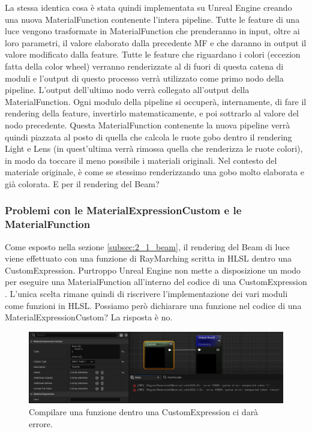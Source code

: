 \documentclass[main.tex]{subfiles}
\begin{document}
\noindent La stessa identica cosa è stata quindi implementata su Unreal Engine creando una nuova MaterialFunction contenente l'intera pipeline. Tutte le feature di una luce vengono trasformate in MaterialFunction che prenderanno in input, oltre ai loro parametri, il valore elaborato dalla precedente MF e che daranno in output il valore modificato dalla feature. Tutte le feature che riguardano i colori (eccezion fatta della color wheel) verranno renderizzate al di fuori di questa catena di moduli e l'output di questo processo verrà utilizzato come primo nodo della pipeline. L'output dell'ultimo nodo verrà collegato all'output della MaterialFunction. Ogni modulo della pipeline si occuperà, internamente, di fare il rendering della feature, invertirlo matematicamente, e poi sottrarlo al valore del nodo precedente. \newline
Questa MaterialFunction contenente la nuova pipeline verrà quindi piazzata al posto di quella che calcola le ruote gobo dentro il rendering Light e Lens (in quest'ultima verrà rimossa quella che renderizza le ruote colori), in modo da toccare il meno possibile i materiali originali. Nel contesto del materiale originale, è come se stessimo renderizzando una gobo molto elaborata e già colorata. \newline
E per il rendering del Beam?

\subsubsection{Problemi con le MaterialExpressionCustom e le MaterialFunction}\label{subsec:2_2_CM-MFproblems}
Come esposto nella sezione \ref{subsec:2_1_beam}, il rendering del Beam di luce viene effettuato con una funzione di RayMarching scritta in HLSL dentro una CustomExpression. Purtroppo Unreal Engine non mette a disposizione un modo  per eseguire una MaterialFunction all'interno del codice di una CustomExpression \cite{customExpressionMaterialFunction}. L'unica scelta rimane quindi di riscrivere l'implementazione dei vari moduli come funzioni in HLSL. Possiamo però dichiarare una funzione nel codice di una MaterialExpressionCustom? La risposta è no.
\begin{figure}[H]
    \centering
    \includegraphics[width=1\linewidth]{img/renderingPipeline/meCustomNoFunc.jpg}
    \caption{Compilare una funzione dentro una CustomExpression ci darà errore.}
    \label{fig:2_funcCompileError}
\end{figure}
\end{document}
